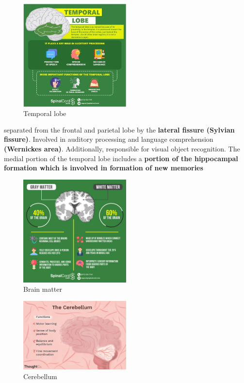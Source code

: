 \documentclass{article}
\begin{document}
    \begin{figure}[H]
    \centering
    \includegraphics[width=0.5\textwidth]{assets/temporalLobe.png}
    \caption{Temporal lobe}
    \end{figure}
    
    \noindent separated from the frontal and parietal lobe by the \textbf{lateral fissure (Sylvian fissure)}. Involved in auditory processing and language comprehension \textbf{(Wernickes area)}. Additionally, responsible for visual object recognition. The medial portion of the temporal lobe includes a \textbf{portion of the hippocampal formation which is involved in formation of new memories}
    
    \begin{figure}[H]
    \centering
    \includegraphics[width=0.5\textwidth]{assets/matter.png}
    \caption{Brain matter}
    \end{figure}
    
    \begin{figure}[H]
    \centering
    \includegraphics[width=0.5\textwidth]{assets/cerebellum.png}
    \caption{Cerebellum}
    \end{figure}
    
\end{document}
